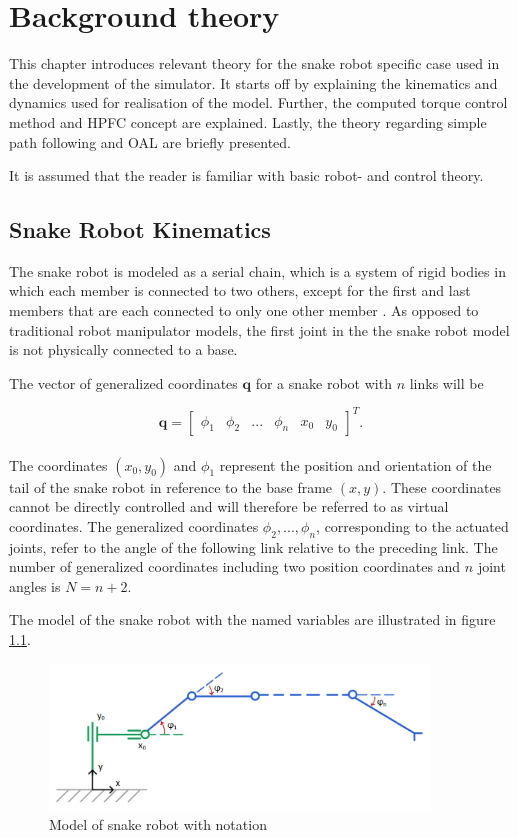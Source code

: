 \chapter{Background theory}\label{chapter:theory}

This chapter introduces relevant theory for the snake robot specific case used in the development of the simulator. It starts off by explaining the kinematics and dynamics used for realisation of the model. Further, the computed torque control method and HPFC concept are explained. Lastly, the theory regarding simple path following and OAL are briefly presented.

It is assumed that the reader is familiar with basic robot- and control theory.


\section{Snake Robot Kinematics} \label{sec:kin}


The snake robot is modeled as a serial chain, which is a system of rigid bodies in which each member is connected to two others, except for the first and last members that are each connected to only one other member \cite{waldron2016kinematics}. As opposed to traditional robot manipulator models, the first joint in the the snake robot model is not physically connected to a base.


The vector of generalized coordinates $\mathbf{q}$ for a snake robot with $n$ links will be

\begin{equation} \label{eq:q}
    \mathbf{q} = 
    \begin{bmatrix}
        \phi_1 & \phi_2 & ... & \phi_n & x_0 & y_0
    \end{bmatrix}^T.
\end{equation}
\\
The coordinates $(x_0, y_0)$ and $\phi_1$ represent the position and orientation of the tail of the snake robot in reference to the base frame $(x,y)$. These coordinates cannot be directly controlled and will therefore be referred to as virtual coordinates. The generalized coordinates ${\phi_2, ... ,  \phi_n}$, corresponding to the actuated joints, refer to the angle of the following link relative to the preceding link. The number of generalized coordinates including two position coordinates and $n$ joint angles is $N = n+2$.

The model of the snake robot with the named variables are illustrated in figure \ref{fig:kin_name}. 
\begin{figure}
    \centering
    \includegraphics[width=0.9\textwidth]{figures/kinematics.PNG}
    \caption{Model of snake robot with notation}
    \label{fig:kin_name}
\end{figure}


